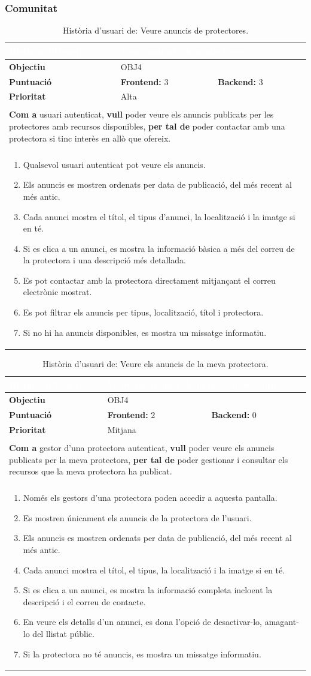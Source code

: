 \documentclass[11pt,a4paper]{report}
\newcommand{\HU}[9]{%
\begin{table}[H]\centering\footnotesize\renewcommand{\arraystretch}{1.1}%
\setlength{\extrarowheight}{0pt}%
\begin{tabular}{|l|p{4.8cm}|p{4.8cm}|}\hline
\rowcolor{oceanblue}\textcolor{white}{\textbf{Història d'Usuari}} & \multicolumn{2}{l|}{\textcolor{white}{#2}} \\\hline
\textbf{Objectiu} & \multicolumn{2}{l|}{#1} \\\hline
\rowcolor{gray!10}\textbf{Puntuació} & \textbf{Frontend: } #3 & \textbf{Backend: } #4 \\\hline
\textbf{Prioritat} & \multicolumn{2}{l|}{#5} \\\hline
\rowcolor{oceanblue}\multicolumn{3}{|l|}{\textcolor{white}{\textbf{Descripció}}} \\\hline
\multicolumn{3}{|p{12.5cm}|}{\textbf{Com a} #6, \textbf{vull} #7, \textbf{per tal de} #8.} \\\hline
\rowcolor{oceanblue}\multicolumn{3}{|l|}{\textcolor{white}{\textbf{Criteris d'Acceptació}}} \\\hline
\multicolumn{3}{|p{12.5cm}|}{\begin{enumerate}[leftmargin=0.4cm,topsep=0pt,parsep=0pt,itemsep=1pt,partopsep=0pt,after=\vspace{-3pt}] #9 \end{enumerate}} \\\hline
\end{tabular}\caption[HU: #2]{Història d'usuari de: #2.}\label{tab:hu_#1}\end{table}%
}
\begin{document}
\subsubsection{Comunitat}
    \HU{OBJ4}
    {Veure anuncis de protectores}
    {3}
    {3}
    {Alta}
    {usuari autenticat}
    {poder veure els anuncis publicats per les protectores amb recursos disponibles}
    {poder contactar amb una protectora si tinc interès en allò que ofereix}
    {
        \item Qualsevol usuari autenticat pot veure els anuncis.
        \item Els anuncis es mostren ordenats per data de publicació, del més recent al més antic.
        \item Cada anunci mostra el títol, el tipus d'anunci, la localització i la imatge si en té.
        \item Si es clica a un anunci, es mostra la informació bàsica a més del correu de la protectora i una descripció més detallada.
        \item Es pot contactar amb la protectora directament mitjançant el correu electrònic mostrat.
        \item Es pot filtrar els anuncis per tipus, localització, títol i protectora.
        \item Si no hi ha anuncis disponibles, es mostra un missatge informatiu.
    }
    \HU{OBJ4}
    {Veure els anuncis de la meva protectora}
    {2}
    {0}
    {Mitjana}
    {gestor d'una protectora autenticat}
    {poder veure els anuncis publicats per la meva protectora}
    {poder gestionar i consultar els recursos que la meva protectora ha publicat}
    {
        \item Només els gestors d'una protectora poden accedir a aquesta pantalla.
        \item Es mostren únicament els anuncis de la protectora de l'usuari.
        \item Els anuncis es mostren ordenats per data de publicació, del més recent al més antic.
        \item Cada anunci mostra el títol, el tipus, la localització i la imatge si en té.
        \item Si es clica a un anunci, es mostra la informació completa incloent la descripció i el correu de contacte.
        \item En veure els detalls d'un anunci, es dona l'opció de desactivar-lo, amagant-lo del llistat públic.
        \item Si la protectora no té anuncis, es mostra un missatge informatiu.
    }
\end{document}

